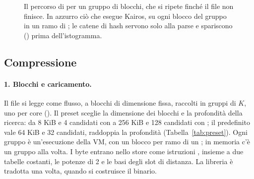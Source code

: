\begin{figure}[t]
\centering
{}
\caption{Il percorso di  per un gruppo di blocchi, che si ripete finché il file non finisce. In azzurro ciò che esegue Kairos, su ogni blocco del gruppo in un ramo di ; le catene di hash servono solo alla parse e spariscono () prima dell'istogramma.}
\label{fig:pipeline}
\end{figure}

\subsection{Compressione}

\paragraph{1. Blocchi e caricamento.} Il file si legge come flusso, a blocchi di dimensione fissa, raccolti in gruppi di $K$, uno per core (). Il preset sceglie la dimensione dei blocchi e la profondità della ricerca: da 8 KiB e 4 candidati con  a 256 KiB e 128 candidati con ; il predefinito  vale 64 KiB e 32 candidati,  raddoppia la profondità (Tabella~\ref{tab:preset}). Ogni gruppo è un'esecuzione della VM, con un blocco per ramo di un ; in memoria c'è un gruppo alla volta. I byte entrano nello store come istruzioni , insieme a due tabelle costanti, le potenze di 2 e le basi degli slot di distanza. La libreria è tradotta una volta, quando si costruisce il binario.

